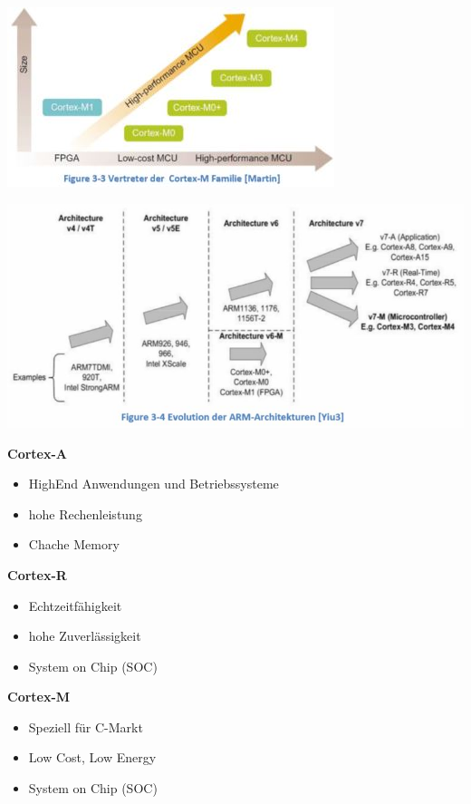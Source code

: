 \begin{multicols}{2}
\includegraphics[width=\linewidth]{images/cortexmfam}

\includegraphics[width=\linewidth]{images/cortexmcomp}
\end{multicols}

\begin{multicols}{3}
    \textbf{Cortex-A}
    \begin{itemize}
        \item HighEnd Anwendungen und Betriebssysteme
        \item hohe Rechenleistung
        \item Chache Memory
    \end{itemize}
    
    \textbf{Cortex-R}
    \begin{itemize}
       \item Echtzeitfähigkeit
       \item hohe Zuverlässigkeit
       \item System on Chip (SOC) 
    \end{itemize}  
    
        \textbf{Cortex-M}
        \begin{itemize}
            \item Speziell für \mu C-Markt
            \item Low Cost, Low Energy
            \item System on Chip (SOC) 
          \end{itemize}             
\end{multicols}
